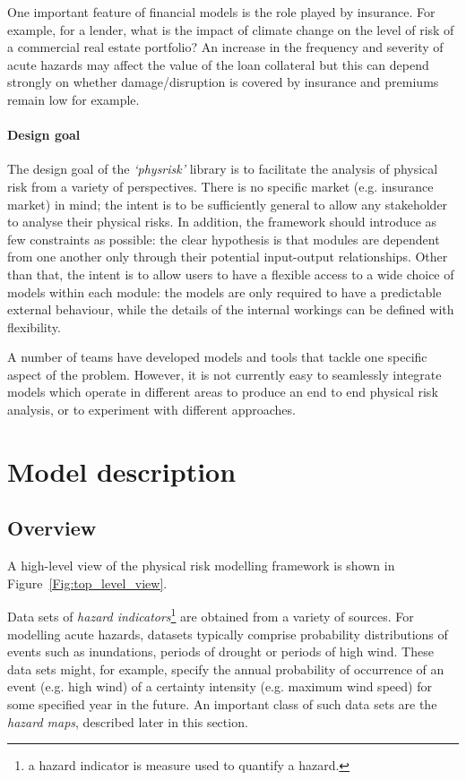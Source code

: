 \documentclass[a4paper,11pt]{extarticle} %
\theoremstyle{definition}
\begin{document}
One important feature of financial models is the role played by insurance. For example, for a lender, what is the impact of climate change on the level of risk of a commercial real estate portfolio? An increase in the frequency and severity of acute hazards may affect the value of the loan collateral but this can depend strongly on whether damage/disruption is covered by insurance and premiums remain low for example.


\paragraph{Design goal}
The design goal of the \emph{`physrisk'} library is to facilitate the analysis of physical risk from a variety of perspectives. There is no specific market (e.g. insurance market) in mind; the intent is to be sufficiently general to allow any stakeholder to analyse their physical risks. In addition, the framework should introduce as few constraints as possible: the clear hypothesis is that modules are dependent from one another only through their potential input-output relationships. Other than that, the intent is to allow users to have a flexible access to a wide choice of models within each module: the models are only required to have a predictable external behaviour, while the details of the internal workings can be defined with flexibility.

A number of teams have developed models and tools that tackle one specific aspect of the problem. However, it is not currently easy to seamlessly integrate models which operate in different areas to produce an end to end physical risk analysis, or to experiment with different approaches.

\section{Model description}

\subsection{Overview}
A high-level view of the physical risk modelling framework is shown in Figure~\ref{Fig:top_level_view}.

Data sets of \emph{hazard indicators}\footnote{a hazard indicator is measure used to quantify a hazard.} are obtained from a variety of sources. For modelling acute hazards, datasets typically comprise probability distributions of events such as inundations, periods of drought or periods of high wind. These data sets might, for example, specify the annual probability of occurrence of an event (e.g. high wind) of a certainty intensity (e.g. maximum wind speed) for some specified year in the future. An important class of such data sets are the \emph{hazard maps}, described later in this section.
\end{document}
